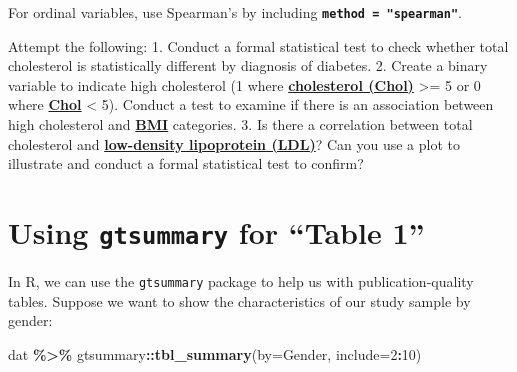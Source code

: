\documentclass[
]{book}
\newenvironment{Shaded}{\begin{snugshade}}{\end{snugshade}}
\newcommand{\AttributeTok}[1]{\textcolor[rgb]{0.13,0.29,0.53}{#1}}
\newcommand{\DecValTok}[1]{\textcolor[rgb]{0.00,0.00,0.81}{#1}}
\newcommand{\FunctionTok}[1]{\textcolor[rgb]{0.13,0.29,0.53}{\textbf{#1}}}
\newcommand{\NormalTok}[1]{#1}
\newcommand{\SpecialCharTok}[1]{\textcolor[rgb]{0.81,0.36,0.00}{\textbf{#1}}}
\begin{document}
For ordinal variables, use Spearman's by including \textbf{\texttt{method\ =\ "spearman"}}.

Attempt the following:
1. Conduct a formal statistical test to check whether total cholesterol is statistically different by diagnosis of diabetes.
2. Create a binary variable to indicate high cholesterol (1 where \textbf{\hyperref[acronyms_Chol]{cholesterol (Chol)}} \textgreater= 5 or 0 where \textbf{\hyperref[acronyms_Chol]{Chol}} \textless{} 5). Conduct a test to examine if there is an association between high cholesterol and \textbf{\hyperref[acronyms_BMI]{BMI}} categories.
3. Is there a correlation between total cholesterol and \textbf{\hyperref[acronyms_LDL]{low-density lipoprotein (LDL)}}? Can you use a plot to illustrate and conduct a formal statistical test to confirm?

\section{\texorpdfstring{Using \texttt{gtsummary} for ``Table 1''}{Using gtsummary for ``Table 1''}}\label{using-gtsummary-for-table-1}

In R, we can use the \texttt{gtsummary} package to help us with publication-quality tables. Suppose we want to show the characteristics of our study sample by gender:

\begin{Shaded}
\begin{Highlighting}[]
\NormalTok{dat }\SpecialCharTok{\%\textgreater{}\%}
\NormalTok{  gtsummary}\SpecialCharTok{::}\FunctionTok{tbl\_summary}\NormalTok{(}\AttributeTok{by=}\NormalTok{Gender, }\AttributeTok{include=}\DecValTok{2}\SpecialCharTok{:}\DecValTok{10}\NormalTok{)}
\end{Highlighting}
\end{Shaded}
\end{document}
